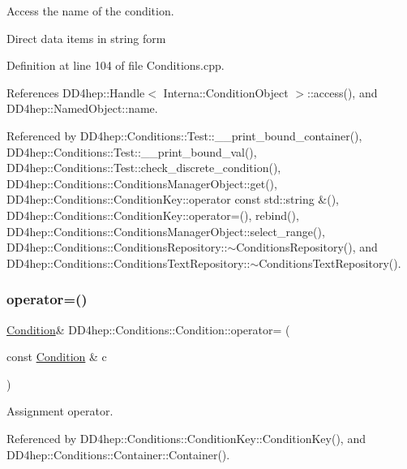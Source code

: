 Access the name of the condition. 

Direct data items in string form 

Definition at line 104 of file Conditions.\+cpp.



References D\+D4hep\+::\+Handle$<$ Interna\+::\+Condition\+Object $>$\+::access(), and D\+D4hep\+::\+Named\+Object\+::name.



Referenced by D\+D4hep\+::\+Conditions\+::\+Test\+::\+\_\+\+\_\+print\+\_\+bound\+\_\+container(), D\+D4hep\+::\+Conditions\+::\+Test\+::\+\_\+\+\_\+print\+\_\+bound\+\_\+val(), D\+D4hep\+::\+Conditions\+::\+Test\+::check\+\_\+discrete\+\_\+condition(), D\+D4hep\+::\+Conditions\+::\+Conditions\+Manager\+Object\+::get(), D\+D4hep\+::\+Conditions\+::\+Condition\+Key\+::operator const std\+::string \&(), D\+D4hep\+::\+Conditions\+::\+Condition\+Key\+::operator=(), rebind(), D\+D4hep\+::\+Conditions\+::\+Conditions\+Manager\+Object\+::select\+\_\+range(), D\+D4hep\+::\+Conditions\+::\+Conditions\+Repository\+::$\sim$\+Conditions\+Repository(), and D\+D4hep\+::\+Conditions\+::\+Conditions\+Text\+Repository\+::$\sim$\+Conditions\+Text\+Repository().

\hypertarget{class_d_d4hep_1_1_conditions_1_1_condition_a2691d97a4770fc129beb2cf61628efa5}{}\label{class_d_d4hep_1_1_conditions_1_1_condition_a2691d97a4770fc129beb2cf61628efa5} 
\subsubsection{\texorpdfstring{operator=()}{operator=()}}
{\footnotesize\ttfamily \hyperlink{class_d_d4hep_1_1_conditions_1_1_condition}{Condition}\& D\+D4hep\+::\+Conditions\+::\+Condition\+::operator= (\begin{DoxyParamCaption}\item[{const \hyperlink{class_d_d4hep_1_1_conditions_1_1_condition}{Condition} \&}]{c }\end{DoxyParamCaption})\hspace{0.3cm}{\ttfamily [default]}}



Assignment operator. 



Referenced by D\+D4hep\+::\+Conditions\+::\+Condition\+Key\+::\+Condition\+Key(), and D\+D4hep\+::\+Conditions\+::\+Container\+::\+Container().

